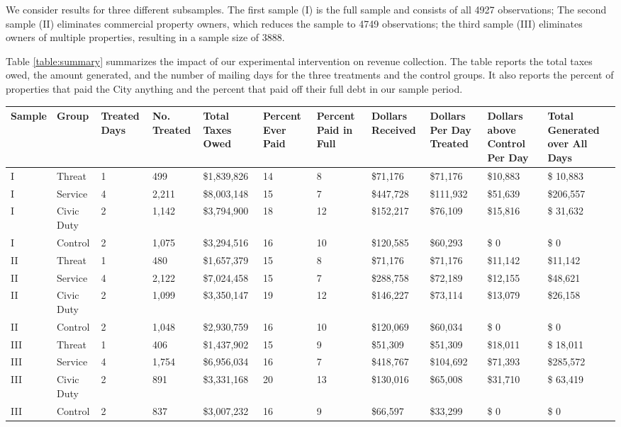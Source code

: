 \documentclass[12pt,titlepage]{article}
\begin{document}
We consider results for three different subsamples.  The first sample
(I) is the full sample and consists of all 4927 observations; The
second sample (II) eliminates commercial property owners, which
reduces the sample to 4749 observations; the third sample (III)
eliminates owners of multiple properties, resulting in a sample size
of 3888.

Table \ref{table:summary} summarizes the impact of our experimental
intervention on revenue collection.  The table reports the total
taxes owed, the amount generated, and the number of mailing days for
the three treatments and the control groups. It also reports the
percent of properties that paid the City anything and the percent that
paid off their full debt in our sample period.


\begin{sidewaystable}[htbp]
\caption{Summary of Effectiveness of Treatment}  \label{table:summary}
\bigskip
\centering
\begin{tabular}{|p{1.3cm}|p{1.3cm}|p{1.3cm}|p{1.3cm}|p{2cm}|p{1.4cm}|p{1.4cm}|p{1.4cm}|p{1.4cm}|p{1.4cm}|p{1.6cm}|}
  \hline
Sample & Group & Treated Days & No. Treated & Total Taxes Owed & Percent Ever Paid & Percent Paid in Full & Dollars Received & Dollars Per Day Treated & Dollars above Control Per Day & Total Generated over All Days \\ 
  \hline
I & Threat & 1 & 499 & \$1,839,826 & 14 &  8 & \$71,176 & \$71,176 & \$10,883 & \$ 10,883 \\ 
  I & Service & 4 & 2,211 & \$8,003,148 & 15 &  7 & \$447,728 & \$111,932 & \$51,639 & \$206,557 \\ 
  I & Civic Duty & 2 & 1,142 & \$3,794,900 & 18 & 12 & \$152,217 & \$76,109 & \$15,816 & \$ 31,632 \\ 
  I & Control & 2 & 1,075 & \$3,294,516 & 16 & 10 & \$120,585 & \$60,293 & \$     0 & \$      0 \\ 
   \hline
II & Threat & 1 & 480 & \$1,657,379 & 15 &  8 & \$71,176 & \$71,176 & \$11,142 & \$11,142 \\ 
  II & Service & 4 & 2,122 & \$7,024,458 & 15 &  7 & \$288,758 & \$72,189 & \$12,155 & \$48,621 \\ 
  II & Civic Duty & 2 & 1,099 & \$3,350,147 & 19 & 12 & \$146,227 & \$73,114 & \$13,079 & \$26,158 \\ 
  II & Control & 2 & 1,048 & \$2,930,759 & 16 & 10 & \$120,069 & \$60,034 & \$     0 & \$     0 \\ 
   \hline
III & Threat & 1 & 406 & \$1,437,902 & 15 &  9 & \$51,309 & \$51,309 & \$18,011 & \$ 18,011 \\ 
  III & Service & 4 & 1,754 & \$6,956,034 & 16 &  7 & \$418,767 & \$104,692 & \$71,393 & \$285,572 \\ 
  III & Civic Duty & 2 & 891 & \$3,331,168 & 20 & 13 & \$130,016 & \$65,008 & \$31,710 & \$ 63,419 \\ 
  III & Control & 2 & 837 & \$3,007,232 & 16 &  9 & \$66,597 & \$33,299 & \$     0 & \$      0 \\ 
   \hline
\end{tabular}
\end{sidewaystable}
\end{document}
